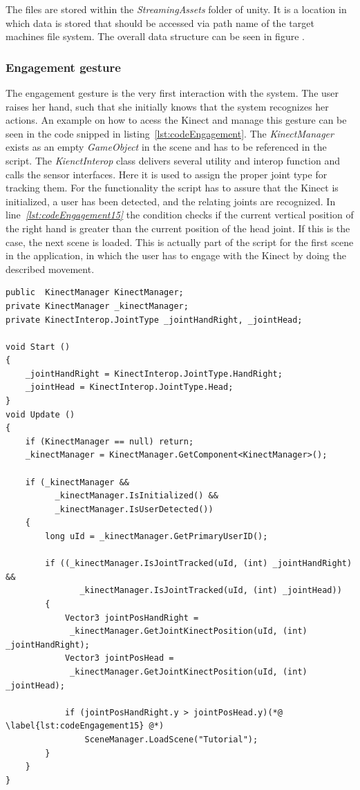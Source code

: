 
The files are stored within the \textit{StreamingAssets} folder of unity. It is a location in which data is stored that should be accessed via path name of the target machines file system. The overall data structure can be seen in figure .


\subsubsection{Engagement gesture}
The engagement gesture is the very first interaction with the system. The user raises her hand, such that she initially knows that the system recognizes her actions. An example on how to acess the Kinect and manage this gesture can be seen in the code snipped in listing~\ref{lst:codeEngagement}. The \textit{KinectManager} exists as an empty \textit{GameObject} in the scene and has to be referenced in the script. The \textit{KienctInterop} class delivers several utility and interop function and calls the sensor interfaces. Here it is used to assign the proper joint type for tracking them. For the functionality the script has to assure that the Kinect is initialized, a user has been detected, and the relating joints are recognized. In line\textit{~\ref{lst:codeEngagement15}} the condition checks if the current vertical position of the right hand is greater than the current position of the head joint. If this is the case, the next scene is loaded. This is actually part of the script for the first scene in the application, in which the user has to engage with the Kinect by doing the described movement.

\begin{lstlisting}[caption=C$^\sharp$ example code for tracking a raising hand, label=lst:codeEngagement]
public  KinectManager KinectManager;
private KinectManager _kinectManager;
private KinectInterop.JointType _jointHandRight, _jointHead;

void Start ()
{
	_jointHandRight = KinectInterop.JointType.HandRight;
	_jointHead = KinectInterop.JointType.Head;
}
void Update ()
{
	if (KinectManager == null) return;
	_kinectManager = KinectManager.GetComponent<KinectManager>();

	if (_kinectManager && 
		  _kinectManager.IsInitialized() && 
		  _kinectManager.IsUserDetected())
	{
		long uId = _kinectManager.GetPrimaryUserID();

		if ((_kinectManager.IsJointTracked(uId, (int) _jointHandRight) && 
			   _kinectManager.IsJointTracked(uId, (int) _jointHead))
		{
			Vector3 jointPosHandRight = 
			 _kinectManager.GetJointKinectPosition(uId, (int) _jointHandRight);
			Vector3 jointPosHead = 
			 _kinectManager.GetJointKinectPosition(uId, (int) _jointHead);			

			if (jointPosHandRight.y > jointPosHead.y)(*@ \label{lst:codeEngagement15} @*)
				SceneManager.LoadScene("Tutorial");
		}
	}
}
\end{lstlisting}
